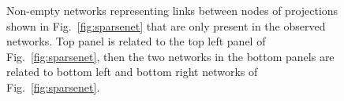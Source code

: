 \documentclass[10pt,a4paper]{article}
\begin{document}
\begin{figure}[h!]
\centering
{}
\caption{\label{fig:sparsenetnotinproj} Non-empty networks representing links between nodes of projections shown in Fig.~\ref{fig:sparsenet} that are only present in the observed networks. Top panel is related to the top left panel of Fig.~\ref{fig:sparsenet}, then the two networks in the bottom panels are related to bottom left and bottom right networks of Fig.~\ref{fig:sparsenet}.}
\end{figure}
\end{document}
